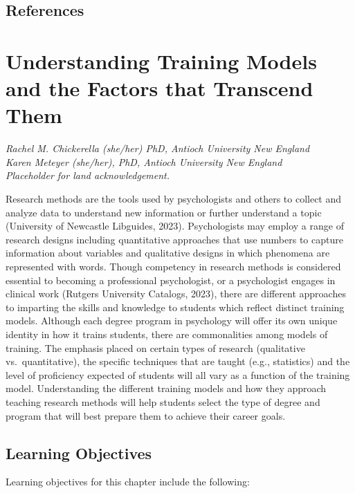 \documentclass[
  11pt,
]{book}
\begin{document}
\section{References}\label{references}

\chapter{Understanding Training Models and the Factors that Transcend Them}\label{TrainMod}

\emph{Rachel M. Chickerella (she/her) PhD, Antioch University New England}\\
\emph{Karen Meteyer (she/her), PhD, Antioch University New England}\\

\emph{Placeholder for land acknowledgement.}~

Research methods are the tools used by psychologists and others to collect and analyze data to understand new information or further understand a topic (University of Newcastle Libguides, 2023). Psychologists may employ a range of research designs including quantitative approaches that use numbers to capture information about variables and qualitative designs in which phenomena are represented with words. Though competency in research methods is considered essential to becoming a professional psychologist, or a psychologist engages in clinical work (Rutgers University Catalogs, 2023), there are different approaches to imparting the skills and knowledge to students which reflect distinct training models. Although each degree program in psychology will offer its own unique identity in how it trains students, there are commonalities among models of training. The emphasis placed on certain types of research (qualitative vs.~quantitative), the specific techniques that are taught (e.g., statistics) and the level of proficiency expected of students will all vary as a function of the training model. Understanding the different training models and how they approach teaching research methods will help students select the type of degree and program that will best prepare them to achieve their career goals.

\section{Learning Objectives}\label{learning-objectives-1}

Learning objectives for this chapter include the following:
\end{document}
